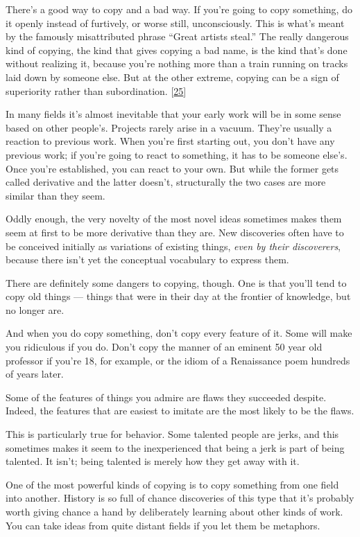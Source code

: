 There's a good way to copy and a bad way. If you're going to copy
something, do it openly instead of furtively, or worse still,
unconsciously. This is what's meant by the famously misattributed phrase
``Great artists steal.'' The really dangerous kind of copying, the kind
that gives copying a bad name, is the kind that's done without realizing
it, because you're nothing more than a train running on tracks laid down
by someone else. But at the other extreme, copying can be a sign of
superiority rather than subordination. {[}\hyperref[f25n]{25}{]}

In many fields it's almost inevitable that your early work will be in
some sense based on other people's. Projects rarely arise in a vacuum.
They're usually a reaction to previous work. When you're first starting
out, you don't have any previous work; if you're going to react to
something, it has to be someone else's. Once you're established, you can
react to your own. But while the former gets called derivative and the
latter doesn't, structurally the two cases are more similar than they
seem.

Oddly enough, the very novelty of the most novel ideas sometimes makes
them seem at first to be more derivative than they are. New discoveries
often have to be conceived initially as variations of existing things,
\emph{even by their discoverers}, because there isn't yet the conceptual
vocabulary to express them.

There are definitely some dangers to copying, though. One is that you'll
tend to copy old things --- things that were in their day at the
frontier of knowledge, but no longer are.

And when you do copy something, don't copy every feature of it. Some
will make you ridiculous if you do. Don't copy the manner of an eminent
50 year old professor if you're 18, for example, or the idiom of a
Renaissance poem hundreds of years later.

Some of the features of things you admire are flaws they succeeded
despite. Indeed, the features that are easiest to imitate are the most
likely to be the flaws.

This is particularly true for behavior. Some talented people are jerks,
and this sometimes makes it seem to the inexperienced that being a jerk
is part of being talented. It isn't; being talented is merely how they
get away with it.

One of the most powerful kinds of copying is to copy something from one
field into another. History is so full of chance discoveries of this
type that it's probably worth giving chance a hand by deliberately
learning about other kinds of work. You can take ideas from quite
distant fields if you let them be metaphors.

